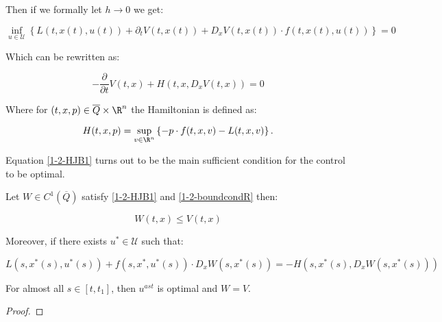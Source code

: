 Then if we formally let $h\to0$ we get:

\[\inf_{u\in\mathcal{U}}\left\{L(t,x(t),u(t)) + \partial_tV(t,x(t)) + D_xV(t,x(t))\cdot f(t,x(t),u(t))\right\}=0\]

Which can be rewritten as:

\begin{equation}\label{1-2-HJB1}
    -\frac{\partial}{\partial t}V(t,x) + H(t,x,D_xV(t,x))=0
\end{equation}

Where for $(t,x,p)\in \overline{Q}\times\R^n$ the Hamiltonian is defined as:

\begin{equation}\label{1-2-Hamiltonian1}
    H(t,x,p) = \sup_{v\in\R^n}\left\{-p\cdot f(t,x,v) - L(t,x,v)\right\}.
\end{equation}

Equation \ref{1-2-HJB1} turns out to be the main sufficient condition for the control to be optimal.

\begin{theorem}\label{1-2-Verificationthe}
    Let $W\in C^1(\overline{Q})$ satisfy \ref{1-2-HJB1} and \ref{1-2-boundcondR} then:

    \[W(t,x)\leq V(t,x)\]

    Moreover, if there exists $u^{\ast}\in\mathcal{U}$ such that:

    \[L(s,x^{\ast}(s),u^{\ast}(s)) + f(s,x^{\ast},u^{\ast}(s))\cdot D_xW(s,x^{\ast}(s)) = - H(s,x^{\ast}(s),D_xW(s,x^{\ast}(s)))\]

    For almost all $s\in[t,t_1]$, then $u^{ast}$ is optimal and $W=V$.

    \begin{proof}
        
    \end{proof}
\end{theorem}